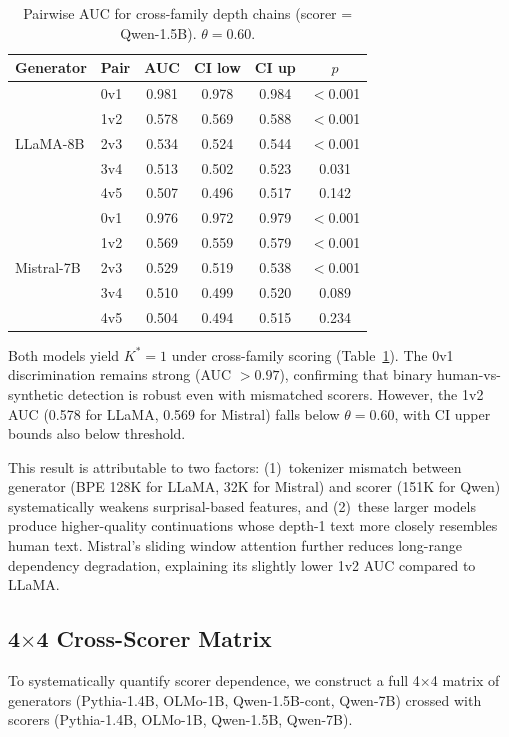 \documentclass[11pt,a4paper]{article}
\newcommand{\kstar}{K^{*}}
\begin{document}
\begin{table}[t]
\centering
\small
\caption{Pairwise AUC for cross-family depth chains (scorer = Qwen-1.5B). $\theta = 0.60$.}
\label{tab:cross_family}
\begin{tabular}{llcccc}
\toprule
Generator & Pair & AUC & CI low & CI up & $p$ \\
\midrule
\multirow{5}{*}{LLaMA-8B}
& 0v1 & 0.981 & 0.978 & 0.984 & $<$0.001 \\
& 1v2 & 0.578 & 0.569 & 0.588 & $<$0.001 \\
& 2v3 & 0.534 & 0.524 & 0.544 & $<$0.001 \\
& 3v4 & 0.513 & 0.502 & 0.523 & 0.031 \\
& 4v5 & 0.507 & 0.496 & 0.517 & 0.142 \\
\midrule
\multirow{5}{*}{Mistral-7B}
& 0v1 & 0.976 & 0.972 & 0.979 & $<$0.001 \\
& 1v2 & 0.569 & 0.559 & 0.579 & $<$0.001 \\
& 2v3 & 0.529 & 0.519 & 0.538 & $<$0.001 \\
& 3v4 & 0.510 & 0.499 & 0.520 & 0.089 \\
& 4v5 & 0.504 & 0.494 & 0.515 & 0.234 \\
\bottomrule
\end{tabular}
\end{table}

Both models yield $\kstar = 1$ under cross-family scoring (Table~\ref{tab:cross_family}).
The 0v1 discrimination remains strong (AUC $> 0.97$), confirming that binary human-vs-synthetic detection is robust even with mismatched scorers.
However, the 1v2 AUC (0.578 for LLaMA, 0.569 for Mistral) falls below $\theta = 0.60$, with CI upper bounds also below threshold.

This result is attributable to two factors: (1)~tokenizer mismatch between generator (BPE 128K for LLaMA, 32K for Mistral) and scorer (151K for Qwen) systematically weakens surprisal-based features, and (2)~these larger models produce higher-quality continuations whose depth-1 text more closely resembles human text.
Mistral's sliding window attention further reduces long-range dependency degradation, explaining its slightly lower 1v2 AUC compared to LLaMA.

\subsection{4$\times$4 Cross-Scorer Matrix}
\label{sec:cross_scorer}

To systematically quantify scorer dependence, we construct a full 4$\times$4 matrix of generators (Pythia-1.4B, OLMo-1B, Qwen-1.5B-cont, Qwen-7B) crossed with scorers (Pythia-1.4B, OLMo-1B, Qwen-1.5B, Qwen-7B).
\end{document}
